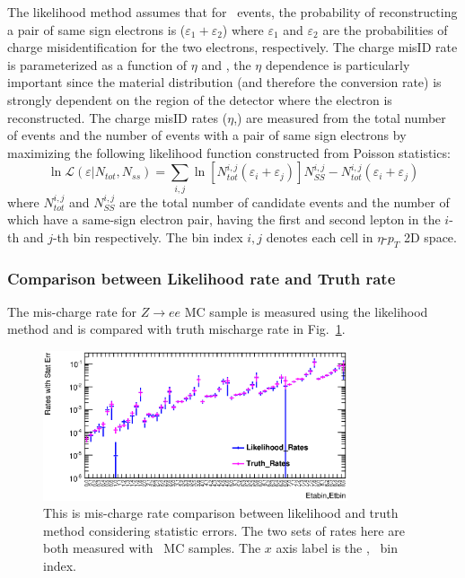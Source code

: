 The likelihood method assumes that for \Zee\ events, the probability
of reconstructing a pair of same sign electrons is ($\varepsilon_1 +
\varepsilon_2$) where $\varepsilon_1$ and $\varepsilon_2$ are the
probabilities of charge misidentification for the two electrons,
respectively. The charge misID rate is parameterized as a function of
$\eta$ and \pt, the $\eta$ dependence is particularly important since
the material distribution (and therefore the conversion rate) is
strongly dependent on the region of the detector where the electron is
reconstructed. The charge misID rates ($\eta$,\pt) are measured from
the total number of events and the number of events with a pair of
same sign electrons by maximizing the following likelihood function
constructed from Poisson statistics: 
\begin{equation}
    \ln\mathcal{L}(\varepsilon|N_{tot},N_{ss}) =
    \sum_{i,j}\ln\left[N_{tot}^{i,j}(\varepsilon_{i}+\varepsilon_{j})\right] N_{SS}^{i,j}-N_{tot}^{i,j}(\varepsilon_{i}+\varepsilon_{j})
    \label{eq:lnL_chargeMisID}
\end{equation}
where $N_{tot}^{i,j}$ and $N_{SS}^{i,j}$ are the total number of
candidate events and the number of which have a same-sign electron
pair, having the first and second lepton in the $i$-th and $j$-th bin
respectively. The bin index $i,j$ denotes each cell in $\eta$-$p_T$ 2D
space.

\subsubsection{Comparison between Likelihood rate and Truth rate}
   The mis-charge rate for $Z\rightarrow ee$ MC sample is measured
   using the likelihood method and is compared with truth mischarge
   rate in Fig.~\ref{fig:LL_Truth_Comparison}.

\begin{figure}[htp]
\centering
\includegraphics[width=0.8\textwidth]{figures/ChargeMisID/LL_TR_Com.eps}
\caption{This is mis-charge rate comparison between likelihood and
  truth method considering statistic errors. The two sets of rates
  here are both measured with \Zee\ MC samples. The $x$ axis label is
  the \eta, \pt\ bin index.}
\label{fig:LL_Truth_Comparison}
\end{figure}  

